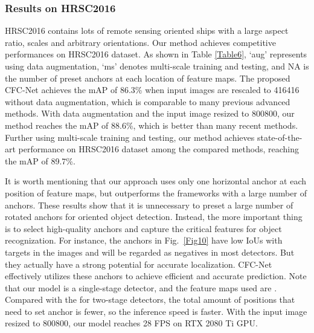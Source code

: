 \documentclass[journal]{IEEEtran}
\begin{document}
\subsubsection{Results on HRSC2016}
HRSC2016 contains lots of remote sensing oriented ships with a large aspect ratio, scales and arbitrary orientations. Our method achieves competitive performances on HRSC2016 dataset. As shown in Table \ref{Table6}, ‘aug’ represents using data augmentation, ‘ms’ denotes multi-scale training and testing, and NA is the number of preset anchors at each location of feature maps. The proposed CFC-Net achieves the mAP of 86.3\% when input images are rescaled to 416416 without data augmentation, which is comparable to many previous advanced methods. With data augmentation and the input image resized to 800800, our method reaches the mAP of 88.6\%, which is better than many recent methods. Further using multi-scale training and testing, our method achieves state-of-the-art performance on HRSC2016 dataset among the compared  methods, reaching the mAP of 89.7\%. 

It is worth mentioning that our approach uses only one horizontal anchor at each position of feature maps, but outperforms the frameworks with a large number of anchors. These results show that it is unnecessary to preset a large number of rotated anchors for oriented object detection. Instead, the more important thing is to select high-quality anchors and capture the critical features for object recognization. For instance,  the anchors in Fig.~\ref{Fig10} have low IoUs with targets in the images and will be regarded as negatives in most detectors. But they actually have a strong potential for accurate localization. CFC-Net effectively utilizes these anchors to achieve efficient and accurate prediction. Note that our model is a single-stage detector, and the feature maps used are . Compared with the  for two-stage detectors, the total amount of positions that need to set anchor is fewer, so the inference speed is faster. With the input image resized to 800800, our model reaches 28 FPS on RTX 2080 Ti GPU.
\end{document}
